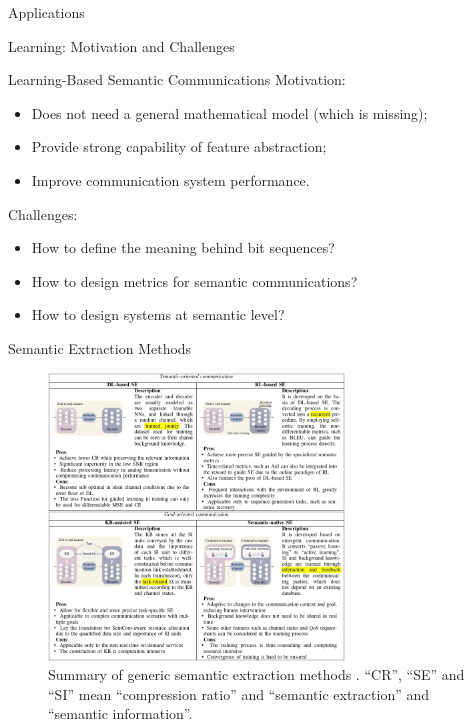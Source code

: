 \documentclass[presentation,mathserif,9pt]{beamer}
\begin{document}
\begin{section}{Applications}
	\begin{subsection}{Learning: Motivation and Challenges}
		\begin{frame}{Learning-Based Semantic Communications}
			Motivation:
			\begin{itemize}
				\item Does not need a general mathematical model (which is missing);
				\item Provide strong capability of feature abstraction;
				\item Improve communication system performance.
			\end{itemize}
			\singlespacing
			Challenges:
			\begin{itemize}
				\item How to define the meaning behind bit sequences?
				\item How to design metrics for semantic communications?
				\item How to design systems at semantic level?
			\end{itemize}
		\end{frame}

		\begin{frame}{Semantic Extraction Methods}
			\begin{figure}
				\includegraphics[width=0.7\textwidth]{assets/learning.jpg}
				\caption{Summary of generic semantic extraction methods \cite{Yang2022c}. ``CR'', ``SE'' and ``SI'' mean ``compression ratio'' and ``semantic extraction'' and ``semantic information''.}
			\end{figure}
		\end{frame}
	\end{subsection}


\end{section}
\end{document}
